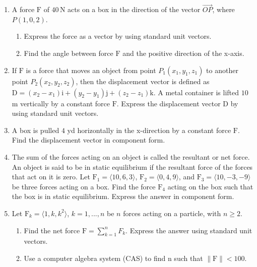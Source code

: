 \documentclass{exercises}
\begin{document}
\begin{enumerate}[resume]
\begin{enumerate}[label=(\alph*)]
  \item Express the force as a vector in component form.
  \item Find the angle between force $\text{F}$ and the positive direction of the x-axis. Express the answer in degrees rounded to the nearest integer.
\end{enumerate}
\item \techrequired A force $\text{F}$ of $40\,\text{N}$ acts on a box in the direction of the vector $\overset{\to}{OP}$, where $P(1,0,2)$.
\begin{enumerate}[label=(\alph*)]
  \item Express the force as a vector by using standard unit vectors.
  \item Find the angle between force $\text{F}$ and the positive direction of the x-axis.
\end{enumerate}
\item If $\text{F}$ is a force that moves an object from point $P_{1}(x_{1},y_{1},z_{1})$ to another point $P_{2}(x_{2},y_{2},z_{2})$, then the displacement vector is defined as $\text{D}=(x_{2}-x_{1})\text{i}+(y_{2}-y_{1})\text{j}+(z_{2}-z_{1})\text{k}$. A metal container is lifted $10$ m vertically by a constant force $\text{F}$. Express the displacement vector $\text{D}$ by using standard unit vectors.
\item A box is pulled $4$ yd horizontally in the x-direction by a constant force $\text{F}$. Find the displacement vector in component form.
\item The sum of the forces acting on an object is called the resultant or net force. An object is said to be in static equilibrium if the resultant force of the forces that act on it is zero. Let $\text{F}_{1}=\langle10,6,3\rangle$, $\text{F}_{2}=\langle0,4,9\rangle$, and $\text{F}_{3}=\langle10,-3,-9\rangle$ be three forces acting on a box. Find the force $\text{F}_{4}$ acting on the box such that the box is in static equilibrium. Express the answer in component form.
\item \techrequired Let $\text{F}_{k}=\langle1,k,k^{2}\rangle$, $k=1,...,n$ be $n$ forces acting on a particle, with $n\ge2$.
\begin{enumerate}[label=(\alph*)]
  \item Find the net force $\text{F}=\sum_{k=1}^{n}F_{k}$. Express the answer using standard unit vectors.
  \item Use a computer algebra system (CAS) to find n such that $\|\text{F}\|<100$.

\end{enumerate}
\end{enumerate}
\end{document}
